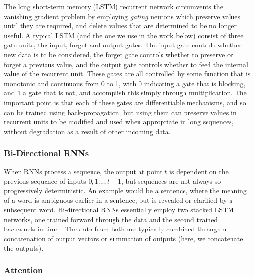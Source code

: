 \documentclass[utf8]{frontiersSCNS} %
\begin{document}
The long short-term memory (LSTM) \cite{Hochreiter1997a, GravesRNNBook} recurrent network circumvents the vanishing gradient problem by employing \emph{gating} neurons which preserve values until they are required, and delete values that are determined to be no longer useful. A typical LSTM (and the one we use in the work below) consist of three gate units, the input, forget and output gates. The input gate controls whether new data is to be considered, the forget gate controls whether to preserve or forget a previous value, and the output gate controls whether to feed the internal value of the recurrent unit. These gates are all controlled by some function that is monotonic and continuous from 0 to 1, with 0 indicating a gate that is blocking, and 1 a gate that is not, and accomplish this simply through multiplication. The important point is that each of these gates are differentiable mechanisms, and so can be trained using back-propagation, but using them can preserve values in recurrent units to be modified and used when appropriate in long sequences, without degradation as a result of other incoming data.

\subsubsection{Bi-Directional RNNs}

When RNNs process a sequence, the output at point $t$ is dependent on the previous sequence of inputs $0, 1..., t-1$, but sequences are not always so progressively deterministic. An example would be a sentence, where the meaning of a word is ambiguous earlier in a sentence, but is revealed or clarified by a subsequent word. Bi-directional RNNs essentially employ two stacked LSTM networks, one trained forward through the data and the second trained backwards in time \cite{GravesRNNBook}. The data from both are typically combined through a concatenation of output vectors or summation of outputs (here, we concatenate the outputs).

\subsubsection{Attention} \label{sec:attn_description}

\end{document}
